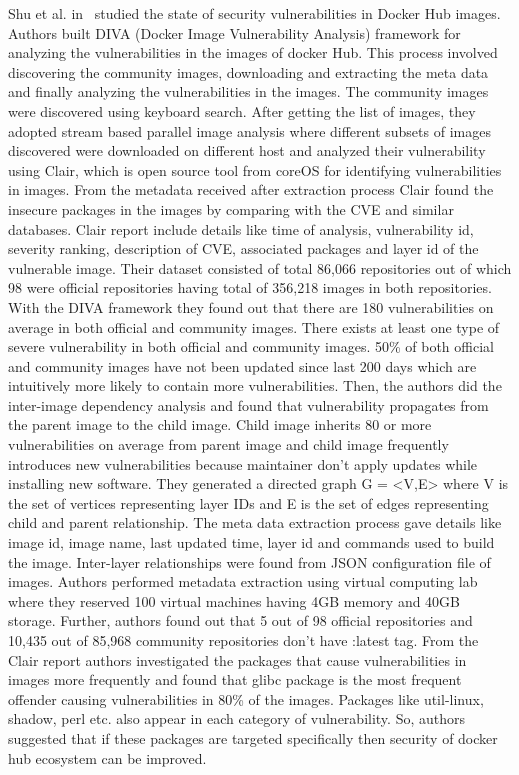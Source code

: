 Shu et al. in~\cite{Shu2017} studied the state of security
vulnerabilities in Docker Hub images.
Authors built DIVA (Docker Image Vulnerability Analysis) framework for analyzing 
the vulnerabilities in the images of docker Hub. This process involved discovering 
the community images, downloading and extracting the meta data and finally analyzing 
the vulnerabilities in the images. The community images were discovered using 
keyboard search. After getting the list of images, they adopted stream based 
parallel image analysis where different subsets of images discovered were 
downloaded on different host and analyzed their vulnerability using Clair, 
which is open source tool from coreOS for identifying vulnerabilities in 
images. From the metadata received after extraction process Clair 
found the insecure packages in the images by comparing with the CVE and similar 
databases. Clair report include details like time of analysis, vulnerability id, 
severity ranking, description of CVE, associated packages and layer id of the 
vulnerable image. Their dataset consisted of total 86,066 repositories out of 
which 98 were official repositories having total of 356,218 images in both 
repositories. With the DIVA framework they found out that there are 180 
vulnerabilities on average in both official and community images. There 
exists at least one type of severe vulnerability in both official and 
community images. 50\% of both official and community images have not 
been updated since last 200 days which are intuitively more likely 
to contain more vulnerabilities.
Then, the authors did the inter-image dependency analysis and found 
that vulnerability propagates from the parent image to the child image. 
Child image inherits 80 or more vulnerabilities on average from parent 
image and child image frequently introduces new vulnerabilities because 
maintainer don’t apply updates while installing new software.  
They generated a directed graph G = <V,E> where V is the set of vertices 
representing layer IDs and E is the set of edges representing child and 
parent relationship. The meta data extraction process gave details like 
image id, image name, last updated time, layer id and commands used to 
build the image. Inter-layer relationships were found from JSON configuration 
file of images. Authors performed metadata extraction using virtual computing 
lab where they reserved 100 virtual machines having 4GB memory and 40GB storage. 
Further, authors found out that 5 out of 98 official repositories and 10,435 out 
of 85,968 community repositories don’t have :latest tag.  From the Clair report 
authors investigated the packages that cause vulnerabilities in images more 
frequently and found that glibc package is the most frequent offender causing 
vulnerabilities in 80\% of the images. Packages like util-linux, shadow, perl etc. 
also appear in each category of vulnerability. So, authors suggested that if 
these packages are targeted specifically then security of docker hub ecosystem 
can be improved.

